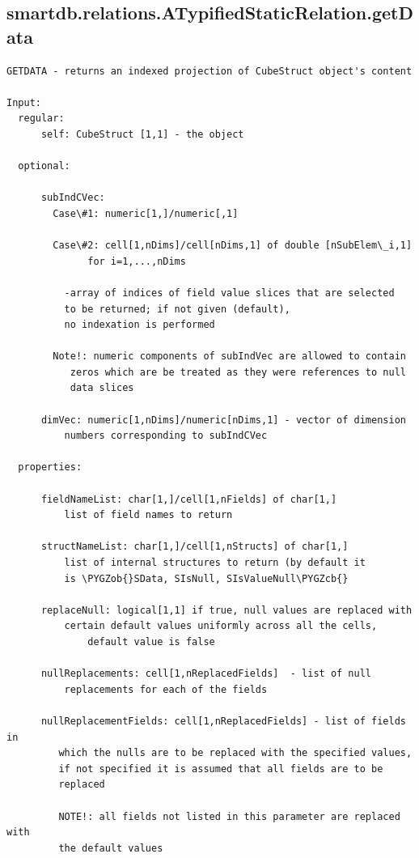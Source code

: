 \documentclass[letterpaper,10pt,english]{sphinxmanual}
\def\PYGZob{\char`\{}
\def\PYGZcb{\char`\}}
\begin{document}
\subsection{smartdb.relations.ATypifiedStaticRelation.getData}
\label{chap_functions:smartdb-relations-atypifiedstaticrelation-getdata}
\begin{Verbatim}[commandchars=\\\{\}]
GETDATA - returns an indexed projection of CubeStruct object's content

Input:
  regular:
      self: CubeStruct [1,1] - the object

  optional:

      subIndCVec:
        Case\#1: numeric[1,]/numeric[,1]

        Case\#2: cell[1,nDims]/cell[nDims,1] of double [nSubElem\_i,1]
              for i=1,...,nDims

          -array of indices of field value slices that are selected
          to be returned; if not given (default),
          no indexation is performed

        Note!: numeric components of subIndVec are allowed to contain
           zeros which are be treated as they were references to null
           data slices

      dimVec: numeric[1,nDims]/numeric[nDims,1] - vector of dimension
          numbers corresponding to subIndCVec

  properties:

      fieldNameList: char[1,]/cell[1,nFields] of char[1,]
          list of field names to return

      structNameList: char[1,]/cell[1,nStructs] of char[1,]
          list of internal structures to return (by default it
          is \PYGZob{}SData, SIsNull, SIsValueNull\PYGZcb{}

      replaceNull: logical[1,1] if true, null values are replaced with
          certain default values uniformly across all the cells,
              default value is false

      nullReplacements: cell[1,nReplacedFields]  - list of null
          replacements for each of the fields

      nullReplacementFields: cell[1,nReplacedFields] - list of fields in
         which the nulls are to be replaced with the specified values,
         if not specified it is assumed that all fields are to be
         replaced

         NOTE!: all fields not listed in this parameter are replaced with
         the default values


\end{Verbatim}
\end{document}
